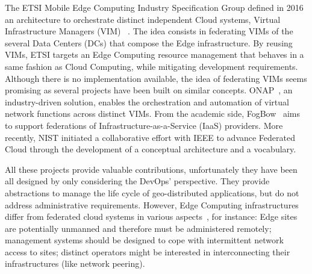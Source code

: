 


%
The ETSI Mobile Edge Computing Industry Specification Group
defined in 2016 an architecture to orchestrate distinct
independent Cloud systems, \aka Virtual
Infrastructure Managers (VIM) ~\cite{7574435}.
%
The idea consists in federating VIMs of the several Data Centers (DCs) that
compose the Edge infrastructure.  By reusing VIMs, ETSI targets an Edge
Computing resource management that behaves in a same fashion as Cloud
Computing, while mitigating development requirements.
%
Although there is no implementation available, the idea of federating
VIMs seems promising as several projects have been built on similar
concepts. ONAP~\cite{onap}, an industry-driven solution,
enables the orchestration and automation of virtual network functions
across distinct VIMs. From the academic side, FogBow~\cite{brasileiro2016fogbow} aims to support federations
of Infrastructure-as-a-Service (IaaS) providers. More recently, NIST
initiated a collaborative effort with IEEE to advance Federated
Cloud through the development of a conceptual architecture and a
vocabulary.

All these projects provide valuable contributions, unfortunately they have
been all designed by only considering the DevOps' perspective. They provide
abstractions to manage the life cycle of geo-distributed applications,
but do not address administrative requirements.
%
However, Edge Computing infrastructures differ from federated cloud systems
in various aspects~\cite{openstack:whitepaper}, for instance:
Edge sites are potentially unmanned and therefore must be administered remotely;
management systems should be designed to cope with intermittent network access to sites; distinct operators might be interested in interconnecting their infrastructures (like network peering).
%

